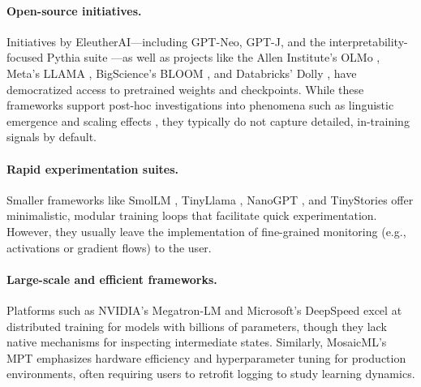 \paragraph{Open-source initiatives.} Initiatives by EleutherAI—including GPT-Neo, GPT-J, and the interpretability-focused Pythia suite \cite{biderman2023pythia}—as well as projects like the Allen Institute's OLMo \citep{groeneveld2024olmo}, Meta's LLAMA \cite{touvron2023llama}, BigScience's BLOOM \cite{le2023bloom}, and Databricks’ Dolly \cite{databricksdolly2023}, have democratized access to pretrained weights and checkpoints. While these frameworks support post-hoc investigations into phenomena such as linguistic emergence and scaling effects \cite{belrose2023eliciting, gurnee2023finding, michaelov2023emergent, diehlmartinez2024tending}, they typically do not capture detailed, in-training signals by default.

\paragraph{Rapid experimentation suites.} Smaller frameworks like SmolLM \citep{allal2025smollm2}, TinyLlama \citep{zhang2024tinyllama}, NanoGPT \cite{karpathy2023nanogpt},  and TinyStories \cite{eldan2023tinystories} offer minimalistic, modular training loops that facilitate quick experimentation. However, they usually leave the implementation of fine-grained monitoring (e.g., activations or gradient flows) to the user.

\paragraph{Large-scale and efficient frameworks.} Platforms such as NVIDIA's Megatron-LM \cite{narayanan2021megatron} and Microsoft's DeepSpeed \cite{rasley2020deepspeed} excel at distributed training for models with billions of parameters, though they lack native mechanisms for inspecting intermediate states. Similarly, MosaicML’s MPT \cite{mosaic2023mpt} emphasizes hardware efficiency and hyperparameter tuning for production environments, often requiring users to retrofit logging to study learning dynamics.

